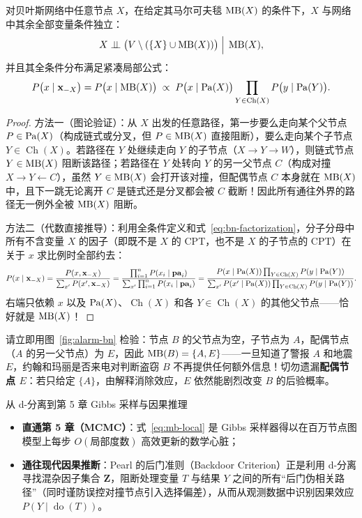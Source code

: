 \begin{thmBox}
\begin{theorem}[马尔可夫毯屏蔽定理]\label{thm:mb}
对贝叶斯网络中任意节点 $X$，在给定其马尔可夫毯 $\operatorname{MB}(X)$ 的条件下，$X$ 与网络中其余全部变量条件独立：
\[
  X \perp\!\!\!\perp \big(V \setminus (\{X\} \cup \operatorname{MB}(X))\big) \;\Big|\; \operatorname{MB}(X),
\]
并且其全条件分布满足紧凑局部公式：
\begin{equation}\label{eq:mb-local}
  P\big(x \mid \mathbf{x}_{-X}\big) = P\big(x \mid \operatorname{MB}(X)\big)
  \;\propto\; P\big(x \mid \operatorname{Pa}(X)\big) \prod_{Y \in \operatorname{Ch}(X)} P\big(y \mid \operatorname{Pa}(Y)\big).
\end{equation}
\end{theorem}
\end{thmBox}

\begin{proof}
方法一（图论验证）：从 $X$ 出发的任意路径，第一步要么走向某个父节点 $P \in \operatorname{Pa}(X)$（构成链式或分叉，但 $P \in \operatorname{MB}(X)$ 直接阻断），要么走向某个子节点 $Y \in \operatorname{Ch}(X)$。若路径在 $Y$ 处继续走向 $Y$ 的子节点（$X \to Y \to W$），则链式节点 $Y \in \operatorname{MB}(X)$ 阻断该路径；若路径在 $Y$ 处转向 $Y$ 的另一父节点 $C$（构成对撞 $X \to Y \leftarrow C$），虽然 $Y \in \operatorname{MB}(X)$ 会打开该对撞，但配偶节点 $C$ 本身就在 $\operatorname{MB}(X)$ 中，且下一跳无论离开 $C$ 是链式还是分叉都会被 $C$ 截断！因此所有通往外界的路径无一例外全被 $\operatorname{MB}(X)$ 阻断。

方法二（代数直接推导）：利用全条件定义和式~\eqref{eq:bn-factorization}，分子分母中所有不含变量 $X$ 的因子（即既不是 $X$ 的 CPT，也不是 $X$ 的子节点的 CPT）在关于 $x$ 求比例时全部约去：
\[
  P(x \mid \mathbf{x}_{-X}) = \frac{P(x, \mathbf{x}_{-X})}{\sum_{x'} P(x', \mathbf{x}_{-X})}
  = \frac{\prod_{i=1}^n P(x_i \mid \mathbf{pa}_i)}{\sum_{x'} \prod_{i=1}^n P(x_i \mid \mathbf{pa}_i)}
  = \frac{P(x \mid \operatorname{Pa}(X)) \prod_{Y \in \operatorname{Ch}(X)} P(y \mid \operatorname{Pa}(Y))}{\sum_{x'} P(x' \mid \operatorname{Pa}(X)) \prod_{Y \in \operatorname{Ch}(X)} P(y \mid \operatorname{Pa}(Y))}.
\]
右端只依赖 $x$ 以及 $\operatorname{Pa}(X)$、$\operatorname{Ch}(X)$ 和各 $Y \in \operatorname{Ch}(X)$ 的其他父节点——恰好就是 $\operatorname{MB}(X)$！
\end{proof}

请立即用图~\ref{fig:alarm-bn} 检验：节点 $B$ 的父节点为空，子节点为 $A$，配偶节点（$A$ 的另一父节点）为 $E$，因此 $\operatorname{MB}(B) = \{A, E\}$——一旦知道了警报 $A$ 和地震 $E$，约翰和玛丽是否来电对判断盗窃 $B$ 不再提供任何额外信息！切勿遗漏\textbf{配偶节点 $E$}：若只给定 $\{A\}$，由解释消除效应，$E$ 依然能剧烈改变 $B$ 的后验概率。

\begin{insightBox}{从 d-分离到第 5 章 Gibbs 采样与因果推理}
\begin{itemize}
  \item \textbf{直通第 5 章（MCMC）}：式~\eqref{eq:mb-local} 是 Gibbs 采样器得以在百万节点图模型上每步 $O(\text{局部度数})$ 高效更新的数学心脏；
  \item \textbf{通往现代因果推断}：Pearl 的后门准则（Backdoor Criterion）正是利用 d-分离寻找混杂因子集合 $\mathbf{Z}$，阻断处理变量 $T$ 与结果 $Y$ 之间的所有“后门伪相关路径”（同时谨防误控对撞节点引入选择偏差），从而从观测数据中识别因果效应 $P(Y \mid \operatorname{do}(T))$。
\end{itemize}
\end{insightBox}

